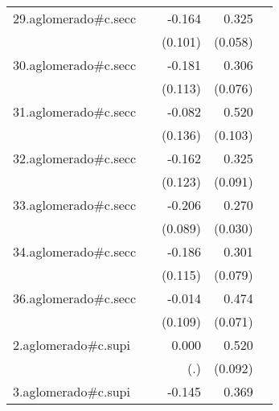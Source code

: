 {\begin{longtable}{l*{4}{D{.}{.}{-1}}}
\addlinespace
29.aglomerado#c.secc&                     &      -0.164         &       0.325\sym{***}&                     \\
            &                     &     (0.101)         &     (0.058)         &                     \\
\addlinespace
30.aglomerado#c.secc&                     &      -0.181         &       0.306\sym{***}&                     \\
            &                     &     (0.113)         &     (0.076)         &                     \\
\addlinespace
31.aglomerado#c.secc&                     &      -0.082         &       0.520\sym{***}&                     \\
            &                     &     (0.136)         &     (0.103)         &                     \\
\addlinespace
32.aglomerado#c.secc&                     &      -0.162         &       0.325\sym{***}&                     \\
            &                     &     (0.123)         &     (0.091)         &                     \\
\addlinespace
33.aglomerado#c.secc&                     &      -0.206\sym{*}  &       0.270\sym{***}&                     \\
            &                     &     (0.089)         &     (0.030)         &                     \\
\addlinespace
34.aglomerado#c.secc&                     &      -0.186         &       0.301\sym{***}&                     \\
            &                     &     (0.115)         &     (0.079)         &                     \\
\addlinespace
36.aglomerado#c.secc&                     &      -0.014         &       0.474\sym{***}&                     \\
            &                     &     (0.109)         &     (0.071)         &                     \\
\addlinespace
2.aglomerado#c.supi&                     &       0.000         &       0.520\sym{***}&                     \\
            &                     &         (.)         &     (0.092)         &                     \\
\addlinespace
3.aglomerado#c.supi&                     &      -0.145         &       0.369\sym{***}&                     \\

\end{longtable}}
